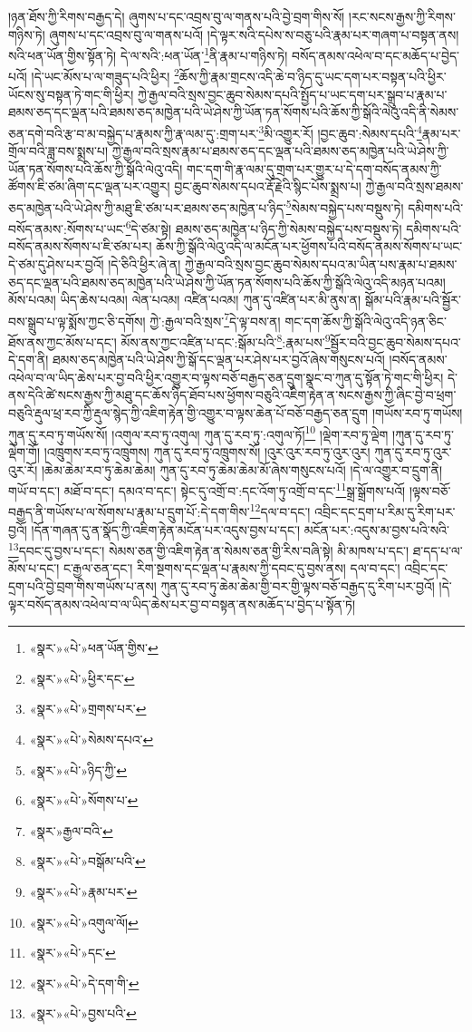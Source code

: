།ཉན་ཐོས་ཀྱི་རིགས་བརྒྱད་དེ། ཞུགས་པ་དང་འབྲས་བུ་ལ་གནས་པའི་བྱེ་བྲག་གིས་སོ། །རང་སངས་རྒྱས་ཀྱི་རིགས་གཉིས་ཏེ། ཞུགས་པ་དང་འབྲས་བུ་ལ་གནས་པའོ། །དེ་ལྟར་སའི་དཔེས་ས་བཅུ་པའི་རྣམ་པར་གཞག་པ་བསྟན་ནས། སའི་ཕན་ཡོན་གྱིས་སྟོན་ཏེ། དེ་ལ་སའི་:ཕན་ཡོན་\footnote{«སྣར་»«པེ་»ཕན་ཡོན་གྱིས་}ནི་རྣམ་པ་གཉིས་ཏེ། བསོད་ནམས་འཕེལ་བ་དང་མཆོད་པ་བྱེད་པའོ། །དེ་ཡང་མོས་པ་ལ་གཟུད་པའི་ཕྱིར། \footnote{«སྣར་»«པེ་»ཕྱིར་དང་}ཆོས་ཀྱི་རྣམ་གྲངས་འདི་ཆེ་བ་ཉིད་དུ་ཡང་དག་པར་བསྟན་པའི་ཕྱིར་ཡོངས་སུ་བསྟན་ཏེ་གང་གི་ཕྱིར། ཀྱེ་རྒྱལ་བའི་སྲས་བྱང་ཆུབ་སེམས་དཔའི་སྤྱོད་པ་ཡང་དག་པར་སྒྲུབ་པ་རྣམ་པ་ཐམས་ཅད་དང་ལྡན་པའི་ཐམས་ཅད་མཁྱེན་པའི་ཡེ་ཤེས་ཀྱི་ཡོན་ཏན་སོགས་པའི་ཆོས་ཀྱི་སྒོའི་ལེའུ་འདི་ནི་སེམས་ཅན་དགེ་བའི་རྩ་བ་མ་བསྐྱེད་པ་རྣམས་ཀྱི་རྣ་ལམ་དུ་:གྲག་པར་\footnote{«སྣར་»«པེ་»གྲགས་པར་}མི་འགྱུར་རོ། །བྱང་ཆུབ་:སེམས་དཔའི་\footnote{«སྣར་»«པེ་»སེམས་དཔའ་}རྣམ་པར་གྲོལ་བའི་ཟླ་བས་སྨྲས་པ། ཀྱེ་རྒྱལ་བའི་སྲས་རྣམ་པ་ཐམས་ཅད་དང་ལྡན་པའི་ཐམས་ཅད་མཁྱེན་པའི་ཡེ་ཤེས་ཀྱི་ཡོན་ཏན་སོགས་པའི་ཆོས་ཀྱི་སྒོའི་ལེའུ་འདི། གང་དག་གི་རྣ་ལམ་དུ་གྲག་པར་གྱུར་པ་དེ་དག་བསོད་ནམས་ཀྱི་ཚོགས་ཇི་ཙམ་ཞིག་དང་ལྡན་པར་འགྱུར། བྱང་ཆུབ་སེམས་དཔའ་རྡོ་རྗེའི་སྙིང་པོས་སྨྲས་པ། ཀྱེ་རྒྱལ་བའི་སྲས་ཐམས་ཅད་མཁྱེན་པའི་ཡེ་ཤེས་ཀྱི་མཐུ་ཇི་ཙམ་པར་ཐམས་ཅད་མཁྱེན་པ་ཉིད་\footnote{«སྣར་»«པེ་»ཉིད་ཀྱི་}སེམས་བསྐྱེད་པས་བསྡུས་ཏེ། དམིགས་པའི་བསོད་ནམས་:སོགས་པ་ཡང་\footnote{«སྣར་»«པེ་»སོགས་པ་}དེ་ཙམ་སྟེ། ཐམས་ཅད་མཁྱེན་པ་ཉིད་ཀྱི་སེམས་བསྐྱེད་པས་བསྡུས་ཏེ། དམིགས་པའི་བསོད་ནམས་སོགས་པ་ཇི་ཙམ་པར། ཆོས་ཀྱི་སྒོའི་ལེའུ་འདི་ལ་མངོན་པར་ཕྱོགས་པའི་བསོད་ནམས་སོགས་པ་ཡང་དེ་ཙམ་དུ་ཤེས་པར་བྱའོ། །དེ་ཅིའི་ཕྱིར་ཞེ་ན། ཀྱེ་རྒྱལ་བའི་སྲས་བྱང་ཆུབ་སེམས་དཔའ་མ་ཡིན་པས་རྣམ་པ་ཐམས་ཅད་དང་ལྡན་པའི་ཐམས་ཅད་མཁྱེན་པའི་ཡེ་ཤེས་ཀྱི་ཡོན་ཏན་སོགས་པའི་ཆོས་ཀྱི་སྒོའི་ལེའུ་འདི་མཉན་པའམ། མོས་པའམ། ཡིད་ཆེས་པའམ། ལེན་པའམ། འཛིན་པའམ། ཀུན་དུ་འཛིན་པར་མི་ནུས་ན། སྒོམ་པའི་རྣམ་པའི་སྦྱོར་བས་སྒྲུབ་པ་ལྟ་སྨོས་ཀྱང་ཅི་དགོས། ཀྱེ་:རྒྱལ་བའི་སྲས་\footnote{«སྣར་»རྒྱལ་བའི་}དེ་ལྟ་བས་ན། གང་དག་ཆོས་ཀྱི་སྒོའི་ལེའུ་འདི་ཉན་ཅིང་ཐོས་ནས་ཀྱང་མོས་པ་དང་། མོས་ནས་ཀྱང་འཛིན་པ་དང་:སྒོམ་པའི་\footnote{«སྣར་»«པེ་»བསྒོམ་པའི་}:རྣམ་པས་\footnote{«སྣར་»«པེ་»རྣམ་པར་}སྦྱོར་བའི་བྱང་ཆུབ་སེམས་དཔའ་དེ་དག་ནི། ཐམས་ཅད་མཁྱེན་པའི་ཡེ་ཤེས་ཀྱི་སྒོ་དང་ལྡན་པར་ཤེས་པར་བྱའོ་ཞེས་གསུངས་པའོ། །བསོད་ནམས་འཕེལ་བ་ལ་ཡིད་ཆེས་པར་བྱ་བའི་ཕྱིར་འགྱུར་བ་ལྟས་བཅོ་བརྒྱད་ཅན་དྲུག་སྣང་བ་ཀུན་དུ་སྟོན་ཏེ་གང་གི་ཕྱིར། དེ་ནས་དེའི་ཚེ་སངས་རྒྱས་ཀྱི་མཐུ་དང་ཆོས་ཉིད་ཐོབ་པས་ཕྱོགས་བཅུའི་འཇིག་རྟེན་ན་སངས་རྒྱས་ཀྱི་ཞིང་བྱེ་བ་ཕྲག་བཅུའི་རྡུལ་ཕྲ་རབ་ཀྱི་རྡུལ་སྙེད་ཀྱི་འཇིག་རྟེན་གྱི་འགྱུར་བ་ལྟས་ཆེན་པོ་བཅོ་བརྒྱད་ཅན་དྲུག །གཡོས་རབ་ཏུ་གཡོས། ཀུན་དུ་རབ་ཏུ་གཡོས་སོ། །འགུལ་རབ་ཏུ་འགུལ། ཀུན་དུ་རབ་ཏུ་:འགུལ་ཏོ།\footnote{«སྣར་»«པེ་»འགུལ་ལོ།} །ལྡེག་རབ་ཏུ་ལྡེག །ཀུན་དུ་རབ་ཏུ་ལྡེག་གོ། །འཁྲུགས་རབ་ཏུ་འཁྲུགས། ཀུན་དུ་རབ་ཏུ་འཁྲུགས་སོ། །འུར་འུར་རབ་ཏུ་འུར་འུར། ཀུན་དུ་རབ་ཏུ་འུར་འུར་རོ། །ཆེམ་ཆེམ་རབ་ཏུ་ཆེམ་ཆེམ། ཀུན་དུ་རབ་ཏུ་ཆེམ་ཆེམ་མོ་ཞེས་གསུངས་པའོ། །དེ་ལ་འགྱུར་བ་དྲུག་ནི། གཡོ་བ་དང་། མཐོ་བ་དང་། དམའ་བ་དང་། སྟེང་དུ་འགྲོ་བ་:དང་འོག་ཏུ་འགྲོ་བ་དང་\footnote{«སྣར་»«པེ་»དང་}སྒྲ་སྒྲོགས་པའོ། །ལྟས་བཅོ་བརྒྱད་ནི་གཡོས་པ་ལ་སོགས་པ་རྣམ་པ་དྲུག་པོ་:དེ་དག་གིས་\footnote{«སྣར་»«པེ་»དེ་དག་གི་}དལ་བ་དང་། འབྲིང་དང་དྲག་པ་རིམ་དུ་རིག་པར་བྱའོ། །དོན་གཞན་དུ་ན་སྣོད་ཀྱི་འཇིག་རྟེན་མངོན་པར་འདུས་བྱས་པ་དང་། མངོན་པར་:འདུས་མ་བྱས་པའི་སའི་\footnote{«སྣར་»«པེ་»བྱས་པའི་}དབང་དུ་བྱས་པ་དང་། སེམས་ཅན་གྱི་འཇིག་རྟེན་ན་སེམས་ཅན་གྱི་རིས་བཞི་སྟེ། མི་མཁས་པ་དང་། ཐ་དད་པ་ལ་མོས་པ་དང་། ང་རྒྱལ་ཅན་དང་། རིག་སྔགས་དང་ལྡན་པ་རྣམས་ཀྱི་དབང་དུ་བྱས་ནས། དལ་བ་དང་། འབྲིང་དང་དྲག་པའི་བྱེ་བྲག་གིས་གཡོས་པ་ནས། ཀུན་དུ་རབ་ཏུ་ཆེམ་ཆེམ་གྱི་བར་གྱི་ལྟས་བཅོ་བརྒྱད་དུ་རིག་པར་བྱའོ། །དེ་ལྟར་བསོད་ནམས་འཕེལ་བ་ལ་ཡིད་ཆེས་པར་བྱ་བ་བསྟན་ནས་མཆོད་པ་བྱེད་པ་སྟོན་ཏེ། 